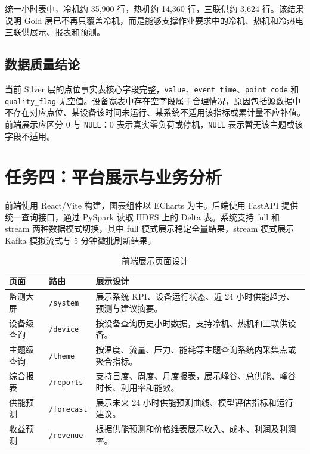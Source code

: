 \documentclass[UTF8,11pt,a4paper]{ctexart}
\newcommand{\code}[1]{\texttt{#1}}
\begin{document}
统一小时表中，冷机约 35,900 行，热机约 14,360 行，三联供约 3,624 行。该结果说明 Gold 层已不再只覆盖冷机，而是能够支撑作业要求中的冷机、热机和冷热电三联供展示、报表和预测。

\subsection{数据质量结论}

当前 Silver 层的点位事实表核心字段完整，\code{value}、\code{event\_time}、\code{point\_code} 和 \code{quality\_flag} 无空值。设备宽表中存在空字段属于合理情况，原因包括源数据中不存在对应点位、某设备该时间未运行、某系统不适用该指标或累计量不应补值。前端展示应区分 0 与 \code{NULL}：0 表示真实零负荷或停机，\code{NULL} 表示暂无该主题或该字段不适用。

\section{任务四：平台展示与业务分析}

前端使用 React/Vite 构建，图表组件以 ECharts 为主。后端使用 FastAPI 提供统一查询接口，通过 PySpark 读取 HDFS 上的 Delta 表。系统支持 full 和 stream 两种数据模式切换，其中 full 模式展示稳定全量结果，stream 模式展示 Kafka 模拟流式与 5 分钟微批刷新结果。



\begin{table}[H]
\centering
\small
\begin{tabularx}{\textwidth}{p{2.5cm}p{2.4cm}Y}
\toprule
页面 & 路由 & 展示设计 \\
\midrule
监测大屏 & \code{/system} & 展示系统 KPI、设备运行状态、近 24 小时供能趋势、预测与建议摘要。 \\
设备级查询 & \code{/device} & 按设备查询历史小时数据，支持冷机、热机和三联供设备。 \\
主题级查询 & \code{/theme} & 按温度、流量、压力、能耗等主题查询系统内采集点或聚合指标。 \\
综合报表 & \code{/reports} & 支持日度、周度、月度报表，展示峰谷、总供能、峰谷时长、利用率和能效。 \\
供能预测 & \code{/forecast} & 展示未来 24 小时供能预测曲线、模型评估指标和运行建议。 \\
收益预测 & \code{/revenue} & 根据供能预测和价格维表展示收入、成本、利润及利润率。 \\
\bottomrule
\end{tabularx}
\caption{前端展示页面设计}
\end{table}
\end{document}
